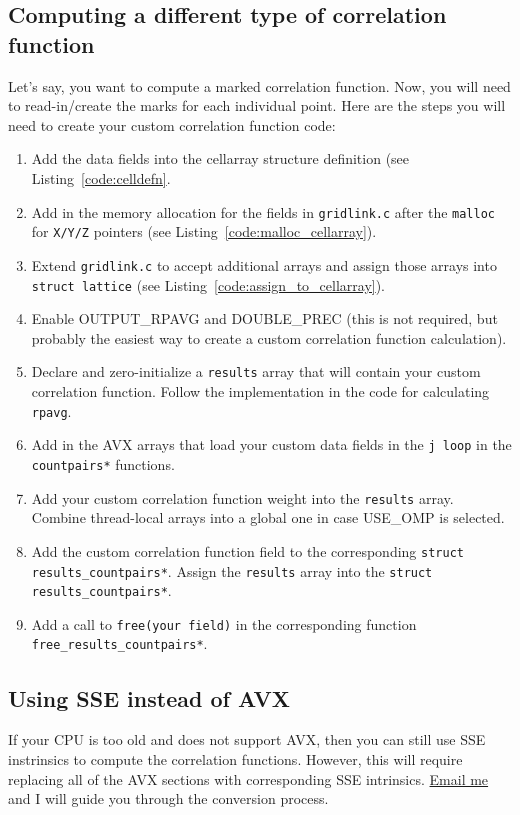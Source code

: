 \documentclass[12pt,titlepage]{article}
\begin{document}
\subsection{Computing a different type of correlation function}
Let's say, you want to compute a marked correlation function. Now, you will need to read-in/create the marks for each individual point. Here are the steps 
you will need to create your custom correlation function code:
\begin{enumerate}
\item Add the data fields into the cellarray structure definition (see Listing~\ref{code:celldefn}.
\item Add in the memory allocation for the fields in \texttt{gridlink.c} after the \texttt{malloc} for \texttt{X/Y/Z} pointers (see Listing~\ref{code:malloc_cellarray}).
\item Extend \texttt{gridlink.c} to accept additional arrays and assign those arrays into \texttt{struct lattice} (see Listing~\ref{code:assign_to_cellarray}).
\item Enable OUTPUT\_RPAVG and DOUBLE\_PREC (this is not required, but probably the easiest way to create a custom correlation function calculation).
\item Declare and zero-initialize a \texttt{results} array that will contain your custom correlation function. Follow the implementation in the code for calculating \texttt{rpavg}.
\item Add in the AVX arrays that load your custom data fields in the \texttt{j loop} in the \texttt{countpairs*} functions.
\item Add your custom correlation function weight into the \texttt{results} array. Combine thread-local arrays into a global one in case USE\_OMP is selected. 
\item Add the custom correlation function field to the corresponding \texttt{struct results\_countpairs*}. Assign the \texttt{results} array into the \texttt{struct results\_countpairs*}.
\item Add a call to \texttt{free(your field)} in the corresponding function \texttt{free\_results\_countpairs*}.
\end{enumerate}

\subsection{Using SSE instead of AVX}
If your CPU is too old and does not support AVX, then you can still use SSE instrinsics to compute the correlation functions. However, this will require replacing all of the 
AVX sections with corresponding SSE intrinsics. \href{mailto:manodeep@gmail.com}{Email me} and I will guide you through the conversion process. 
\end{document}
